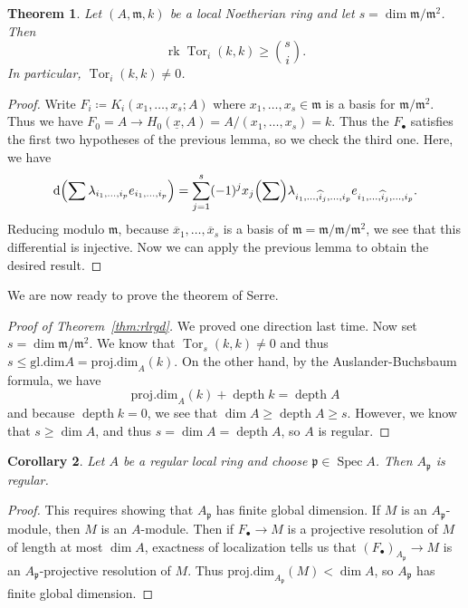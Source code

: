\documentclass[leqno, openany]{memoir}
\newtheorem{thm}{Theorem}[section]
\newtheorem{cor}[thm]{Corollary}
\theoremstyle{definition}
\theoremstyle{remark}
\theoremstyle{plain}
\theoremstyle{definition}
\theoremstyle{remark}
\newcommand{\mf}[1]{\mathfrak{#1}}
\newcommand{\mr}[1]{\mathrm{#1}}
\newcommand{\ol}[1]{\overline{#1}}
\newcommand{\ul}[1]{\underline{#1}}
\newcommand{\wh}[1]{\widehat{#1}}
\DeclareMathOperator{\Spec}{Spec}
\DeclareMathOperator{\Tor}{Tor}
\DeclareMathOperator{\dpth}{depth}
\begin{document}
\begin{thm}
    Let $(A, \mf{m}, k)$ be a local Noetherian ring and let $s = \dim \mf{m} / \mf{m}^2$. Then 
    \[ \operatorname{rk} \Tor_i(k,k) \geq \binom{s}{i}. \]
    In particular, $\Tor_i(k, k) \neq 0$.
\end{thm}

\begin{proof}
    Write $F_i \coloneqq K_i(x_1, \ldots, x_s; A)$ where $x_1, \ldots, x_s \in \mf{m}$ is a basis for $\mf{m} / \mf{m}^2$. Thus we have $F_0 = A \to H_0(\ul{x}, A) = A/(x_1, \ldots, x_s) = k$. Thus the $F_{\bullet}$ satisfies the first two hypotheses of the previous lemma, so we check the third one. Here, we have
    \[ \dd \qty(\sum \lambda_{i_1, \ldots, i_p} e_{i_1, \ldots, i_p}) = \sum_{j=1}^s (-1)^j x_j \qty(\sum) \lambda_{i_1, \ldots, \wh{i}_j, \ldots, i_p} e_{i_1, \ldots, \wh{i}_j, \ldots, i_p}. \]
    Reducing modulo $\mf{m}$, because $\ol{x}_1, \ldots, \ol{x}_s$ is a basis of $\mf{m} = \mf{m} / \mf{m}/\mf{m}^2$, we see that this differential is injective. Now we can apply the previous lemma to obtain the desired result.
\end{proof}

We are now ready to prove the theorem of Serre.

\begin{proof}[Proof of Theorem~\ref{thm:rlrgd}]
    We proved one direction last time. Now set $s = \dim \mf{m} / \mf{m}^2$. We know that $\Tor_s(k,k) \neq 0$ and thus $s \leq \mr{gl.dim} A = \mr{proj.dim}_A(k)$. On the other hand, by the Auslander-Buchsbaum formula, we have
    \[ \mr{proj.dim}_A(k) + \dpth k = \dpth A \]
    and because $\dpth k = 0$, we see that $\dim A \geq \dpth A \geq s$. However, we know that $s \geq \dim A$, and thus $s = \dim A = \dpth A$, so $A$ is regular.
\end{proof}

\begin{cor}
    Let $A$ be a regular local ring and choose $\mf{p} \in \Spec A$. Then $A_{\mf{p}}$ is regular.
\end{cor}

\begin{proof}
    This requires showing that $A_{\mf{p}}$ has finite global dimension. If $M$ is an $A_{\mf{p}}$-module, then $M$ is an $A$-module. Then if $F_{\bullet} \to M$ is a projective resolution of $M$ of length at most $\dim A$, exactness of localization tells us that $(F_{\bullet})_{A_{\mf{p}}} \to M$ is an $A_{\mf{p}}$-projective resolution of $M$. Thus $\mr{proj.dim}_{A_{\mf{p}}}(M) < \dim A$, so $A_{\mf{p}}$ has finite global dimension.
\end{proof}
\end{document}
